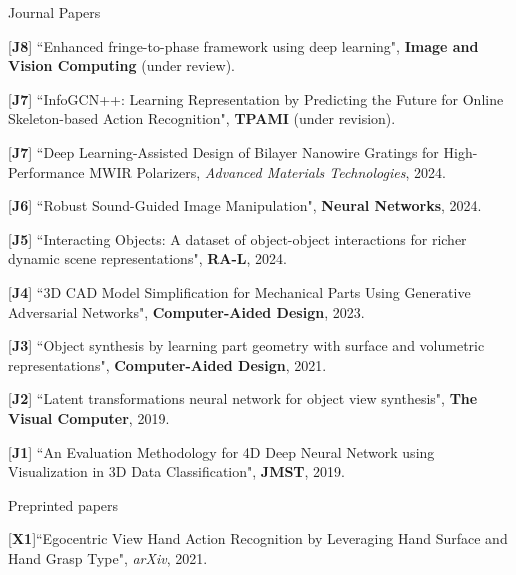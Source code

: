\begin{cventries}
\vspace{-.5em}
\cvpub
{Journal Papers} %
{ %
\begin{cvitems}
    \item {[\textbf{J8}] ``Enhanced fringe-to-phase framework using deep learning", \textbf{Image and Vision Computing} (under review).}
    \item {[\textbf{J7}] ``InfoGCN++: Learning Representation by Predicting the Future for Online Skeleton-based Action Recognition", \textbf{TPAMI} (under revision). }
    \item {[\textbf{J7}] ``Deep Learning-Assisted Design of Bilayer Nanowire Gratings for High-Performance MWIR Polarizers, \textit{Advanced Materials Technologies}, 2024. }
    \item {[\textbf{J6}] ``Robust Sound-Guided Image Manipulation", \textbf{Neural Networks}, 2024.}
    \item {[\textbf{J5}] ``Interacting Objects: A dataset of object-object interactions for richer dynamic scene representations", \textbf{RA-L}, 2024.}
    \item {[\textbf{J4}] ``3D CAD Model Simplification for Mechanical Parts Using Generative Adversarial Networks", \textbf{Computer-Aided Design}, 2023.}
    \item {[\textbf{J3}] ``Object synthesis by learning part geometry with surface and volumetric representations", \textbf{Computer-Aided Design}, 2021.}
    \item {[\textbf{J2}] ``Latent transformations neural network for object view synthesis", \textbf{The Visual Computer}, 2019.}
    \item {[\textbf{J1}] ``An Evaluation Methodology for 4D Deep Neural Network using Visualization in 3D Data Classification", \textbf{JMST}, 2019.}
\end{cvitems}
}

\vspace{-.5em}
\cvpub
{Preprinted papers} %
{
\begin{cvitems}
    \item {[\textbf{X1}]``Egocentric View Hand Action Recognition by Leveraging Hand Surface and Hand Grasp Type", \textit{arXiv}, 2021. }
\end{cvitems}
}


\end{cventries}
